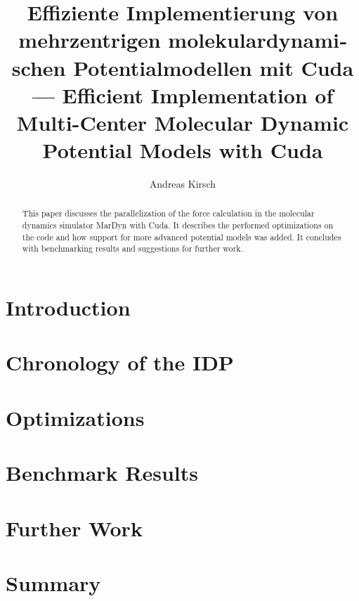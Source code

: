 \documentclass[11pt,a4paper,onecolumn,notitlepage]{scrartcl}
\author{Andreas Kirsch}
\title{\foreignlanguage{ngerman}{Effiziente Implementierung von mehrzentrigen molekulardynamischen Potentialmodellen mit Cuda} \linebreak --- \linebreak Efficient Implementation of Multi-Center Molecular Dynamic Potential Models with Cuda}
\newcommand{\cuda}{Cuda}
\begin{document}
\maketitle

\begin{abstract}
This paper discusses the parallelization of the force calculation in the molecular dynamics simulator MarDyn with \cuda. It describes the performed optimizations on the code and how support for more advanced potential models was added. It concludes with benchmarking results and suggestions for further work.
\end{abstract}

\section{Introduction}

%

\section{Chronology of the IDP}

%


%

\section{Optimizations}



\section{Benchmark Results}



\section{Further Work}



\section{Summary}
\end{document}
